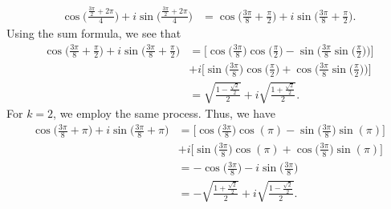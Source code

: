 \documentclass[a4paper]{article}
\begin{document}
\begin{enumerate}
\begin{solution}
\begin{align*}
                    \cos \Big(  \frac{ \frac{ 3 \pi }{ 2 } + 2 \pi }{ 4  }  \Big) + i \sin \Big(  \frac{ \frac{ 3 \pi }{ 2 }  + 2 \pi }{ 4 }  \Big) &= \cos \Big(  \frac{ 3 \pi  }{ 8  } + \frac{ \pi }{ 2 }  \Big) + i \sin \Big(  \frac{ 3 \pi }{ 8 }  + \frac{ \pi }{ 2 }  \Big). 
                \end{align*}
                Using the sum formula, we see that 
                \begin{align*}
                    \cos \Big(  \frac{ 3 \pi  }{ 8  } + \frac{ \pi }{ 2 }  \Big) + i \sin \Big(  \frac{ 3 \pi }{ 8 }  + \frac{ \pi }{ 2 }  \Big) &= \Big[ \cos \Big(  \frac{ 3 \pi  }{ 8 }  \Big) \cos \Big(  \frac{  \pi  }{  2  }  \Big) - \sin \Big(  \frac{ 3 \pi  }{ 8  }  \sin \Big(  \frac{ \pi }{ 2 }  \Big) \Big)\Big]   \\
                                                                                                                                                 &+ i \Big[ \sin \Big(  \frac{ 3 \pi  }{ 8 }  \Big) \cos \Big(  \frac{  \pi  }{ 2 }  \Big) + \cos \Big(  \frac{  3 \pi  }{ 8  }  \sin \Big(  \frac{ \pi }{ 2 }  \Big) \Big) \Big] \\
                                                                                                                                                 &=  \sqrt{  \frac{ 1 - \frac{ \sqrt{ 2 }  }{ 2 }  }{ 2 }  }  + i \sqrt{ \frac{ 1 + \frac{ \sqrt{ 2 }  }{ 2 }  }{ 2 }   }.   
                \end{align*}
                For \( k = 2  \), we employ the same process. Thus, we have
                \begin{align*}
                    \cos \Big( \frac{ 3 \pi  }{ 8 } + \pi    \Big) + i \sin \Big(  \frac{ 3 \pi  }{ 8 }  + \pi \Big) &= \Big[ \cos \Big(  \frac{ 3 \pi  }{ 8  }  \Big) \cos (\pi) - \sin \Big(  \frac{  3 \pi  }{ 8 }  \Big) \sin (\pi)]     \\
                                                                                                                     &+ i \Big[ \sin \Big(  \frac{ 3 \pi }{ 8  }  \Big) \cos (\pi) + \cos \Big(  \frac{ 3 \pi  }{ 8 }  \Big) \sin (\pi)\Big] \\ 
                                                                                                                     &= - \cos \Big(  \frac{ 3 \pi  }{ 8  }  \Big) - i \sin \Big(  \frac{ 3 \pi  }{ 8  }  \Big) \\
                                                                                                                     &= -\sqrt{ \frac{ 1 + \frac{ \sqrt{ 2 }  }{ 2 }  }{ 2 }  }  + i \sqrt{ \frac{ 1 - \frac{ \sqrt{ 2 }  }{ 2 }   }{ 2 }  }.

\end{align*}
\end{solution}
\end{enumerate}
\end{document}
